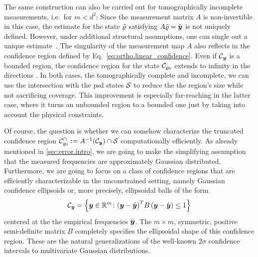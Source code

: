 The same construction can also be carried out for tomographically incomplete measurements, i.e.\ for $m<d^{2}$:
Since the measurement matrix $A$ is non-invertible in this case, the estimate for the state $\hat{\varrho}$ satisfying $A\hat{\varrho} = \hat{{\boldsymbol{y}}}$ is not uniquely defined.
However, under additional structural assumptions, one can single out a unique estimate~\cite{Gross_2010_Quantum,Flammia_2012_Quantum}.
The singularity of the measurement map $A$ also reflects in the confidence region defined by Eq.~\eqref{eq:ortho.linear_confidence}.
Even if $\mathcal{C}_{\boldsymbol{y}}$ is a bounded region, the confidence region for the state $\mathcal{C}_{\varrho_0}$ extends to infinity in the directions .
In both cases, the tomographically complete and incomplete, we can use the intersection with the psd states $\mathcal{S}$ to reduce the the region's size while not sacrificing coverage.
This improvement is especially far-reaching in the latter case, where it turns an unbounded region to a bounded one just by taking into account the physical constraints.


Of course, the question is whether we can somehow characterize the truncated confidence region $\mathcal{C}_{\varrho_0}^\cap := A^{-1}(\mathcal{C}_{\boldsymbol{y}}) \cap \mathcal{S}$ computationally efficiently.
As already mentioned in \cref{sec:error.intro}, we are going to make the simplifying assumption that the measured frequencies are approximately Gaussian distributed.
Furthermore, we are going to focus on a class of confidence regions that are efficiently characterizable in the unconstrained setting, namely Gaussian confidence ellipsoids or, more precisely, ellipsoidal balls of the form
\[
  \mathcal{C}_{\boldsymbol{y}} = \left\{ {\boldsymbol{y}} \in {\mathbb{R}}^m\colon  {\left({\boldsymbol{y}}-\hat{{\boldsymbol{y}}}\right)}^T B\left({\boldsymbol{y}}-\hat{{\boldsymbol{y}}}\right) \leq 1  \right\}
  \label{eq:ortho.confelip}
\]
centered at the the empirical frequencies  $\hat{{\boldsymbol{y}}}$.
The $m\times m$, symmetric, positive semi-definite matrix $B$ completely specifies the ellipsoidal shape of this confidence region.
These are the natural generalizations of the well-known $2\sigma$ confidence intervals to multivariate Gaussian distributions.

